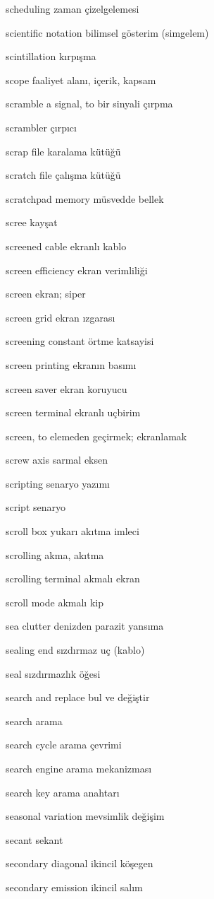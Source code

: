 \documentclass[12pt,fleqn]{article}\usepackage{../../common}
\begin{document}
scheduling zaman çizelgelemesi

scientific notation bilimsel gösterim (simgelem)

scintillation kırpışma

scope faaliyet alanı, içerik, kapsam

scramble a signal, to bir sinyali çırpma

scrambler çırpıcı

scrap file karalama kütüğü

scratch file çalışma kütüğü

scratchpad memory müsvedde bellek

scree kayşat

screened cable ekranlı kablo

screen efficiency ekran verimliliği

screen ekran; siper

screen grid ekran ızgarası

screening constant örtme katsayisi

screen printing ekranın basımı

screen saver ekran koruyucu

screen terminal ekranlı uçbirim

screen, to elemeden geçirmek; ekranlamak

screw axis sarmal eksen

scripting senaryo yazımı

script senaryo

scroll box yukarı akıtma imleci

scrolling akma, akıtma

scrolling terminal akmalı ekran

scroll mode akmalı kip

sea clutter denizden parazit yansıma

sealing end sızdırmaz uç (kablo)

seal sızdırmazlık öğesi

search and replace bul ve değiştir

search arama

search cycle arama çevrimi

search engine arama mekanizması

search key arama anahtarı

seasonal variation mevsimlik değişim

secant sekant

secondary diagonal ikincil köşegen

secondary emission ikincil salım
\end{document}
